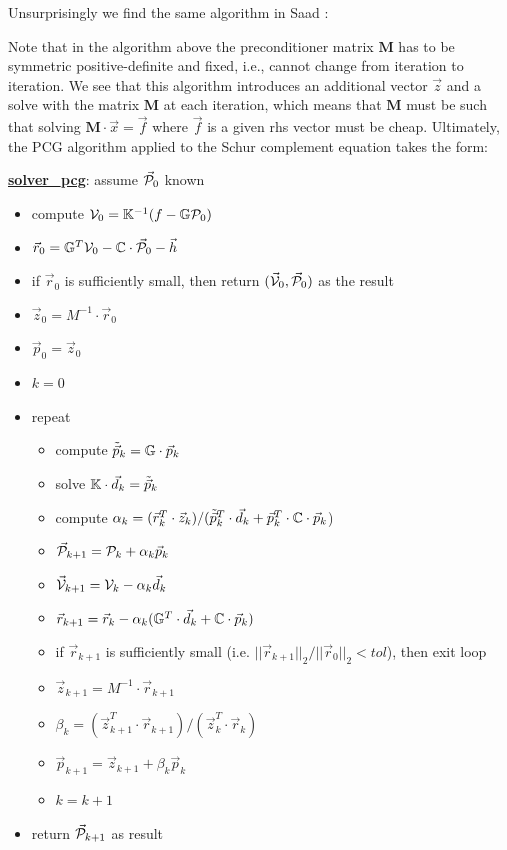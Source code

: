 \vspace{.5cm}

Unsurprisingly we find the same algorithm in Saad \cite{saad}:


Note that in the algorithm above the preconditioner matrix ${\bm M}$ 
has to be symmetric positive-definite and fixed, i.e., cannot change from iteration to iteration. 
We see that this algorithm introduces an additional vector $\vec{z}$ and a solve with the 
matrix ${\bm M}$ at each iteration, which means that ${\bm M}$ must 
be such that solving ${\bm M}\cdot \vec{x}= \vec{f}$ 
where $\vec{f}$ is a given rhs vector must be cheap. Ultimately, the PCG algorithm applied to 
the Schur complement equation takes the form:

\begin{mdframed}[backgroundcolor=blue!5]
\underline{\bf solver\_pcg}: assume $\vec{\cal P}_0$ known
\begin{itemize}
\item compute ${\cal V}_0={\mathbb{K}}^{-1}(f-{\mathbb{G}}{\cal P}_0)$
\item $\vec{r}_0 = {\mathbb{G}}^T {\cal V}_0 - {\mathbb{C}} \cdot \vec{\cal P}_0 - \vec{h}$
\item if $\vec{r}_0$ is sufficiently small, then return $(\vec{\cal V}_0,\vec{\cal P}_0)$ as the result
\item $\vec{z}_0= M^{-1} \cdot \vec{r}_0$ 
\item $\vec{p}_0=\vec{z}_0$
\item $k=0$
\item repeat
\begin{itemize}
\item compute $\tilde{\vec{p}}_k = {\mathbb{G}} \cdot \vec{p}_k$
\item solve ${\mathbb{K}}\cdot  \vec{d}_k = \tilde{\vec{p}}_k$
\item compute $\alpha_k=(\vec{r}_k^T \cdot \vec{z}_k)/(\tilde{\vec{p}}_k^T \cdot \vec{d}_k
      + \vec{p}_k^T\cdot{\mathbb{C}} \cdot \vec{p}_k$)
\item $\vec{\cal P}_{k+1} = {\cal P}_k+\alpha_k \vec{p}_k$
\item $\vec{\cal V}_{k+1} = {\cal V}_k - \alpha_k \vec{d}_k$
\item $\vec{r}_{k+1} = \vec{r}_k - \alpha_k ({\mathbb{G}}^T \cdot \vec{d}_k + {\mathbb{C}} \cdot \vec{p}_k) $
\item if $\vec{r}_{k+1}$ is sufficiently small (i.e. $||\vec{r}_{k+1}||_2/||\vec{r}_0||_2 <tol$), 
      then exit loop
\item $\vec{z}_{k+1}=M^{-1} \cdot \vec{r}_{k+1}$
\item $\beta_k=(\vec{z}_{k+1}^T \cdot  \vec{r}_{k+1})/(\vec{z}_k^T \cdot  \vec{r}_k)$
\item $\vec{p}_{k+1} =\vec{z}_{k+1}+ \beta_k \vec{p}_k$
\item $k=k+1$
\end{itemize}
\item return $\vec{\cal P}_{k+1}$ as result
\end{itemize}
\end{mdframed}

